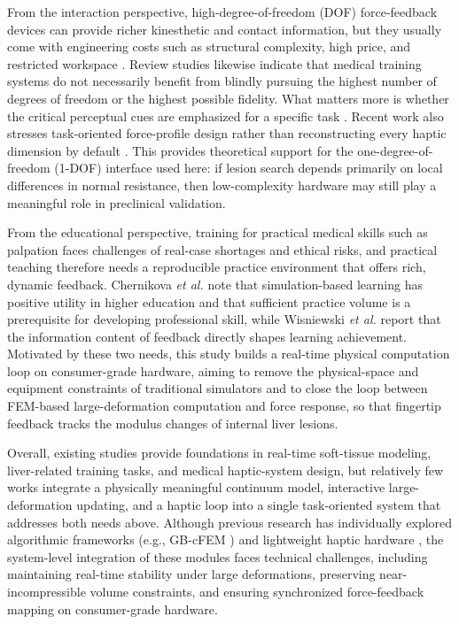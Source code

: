 \documentclass{ieeeaccess}
\begin{document}
From the interaction perspective, high-degree-of-freedom (DOF) force-feedback devices can provide richer kinesthetic and contact information, but they usually come with engineering costs such as structural complexity, high price, and restricted workspace \cite{agboh2016six}. Review studies likewise indicate that medical training systems do not necessarily benefit from blindly pursuing the highest number of degrees of freedom or the highest possible fidelity. What matters more is whether the critical perceptual cues are emphasized for a specific task \cite{overtoom2019haptic,rangarajan2020systematic}. Recent work also stresses task-oriented force-profile design rather than reconstructing every haptic dimension by default \cite{bjelland2025haptic}. This provides theoretical support for the one-degree-of-freedom (1-DOF) interface used here: if lesion search depends primarily on local differences in normal resistance, then low-complexity hardware may still play a meaningful role in preclinical validation.

From the educational perspective, training for practical medical skills such as palpation faces challenges of real-case shortages and ethical risks, and practical teaching therefore needs a reproducible practice environment that offers rich, dynamic feedback. Chernikova \emph{et al.} \cite{chernikova2020simulation} note that simulation-based learning has positive utility in higher education and that sufficient practice volume is a prerequisite for developing professional skill, while Wisniewski \emph{et al.} \cite{wisniewski2020power} report that the information content of feedback directly shapes learning achievement. Motivated by these two needs, this study builds a real-time physical computation loop on consumer-grade hardware, aiming to remove the physical-space and equipment constraints of traditional simulators and to close the loop between FEM-based large-deformation computation and force response, so that fingertip feedback tracks the modulus changes of internal liver lesions.

Overall, existing studies provide foundations in real-time soft-tissue modeling, liver-related training tasks, and medical haptic-system design, but relatively few works integrate a physically meaningful continuum model, interactive large-deformation updating, and a haptic loop into a single task-oriented system that addresses both needs above. Although previous research has individually explored algorithmic frameworks (e.g., GB-cFEM \cite{wang2025group}) and lightweight haptic hardware \cite{xu2025lightweight}, the system-level integration of these modules faces technical challenges, including maintaining real-time stability under large deformations, preserving near-incompressible volume constraints, and ensuring synchronized force-feedback mapping on consumer-grade hardware.
\end{document}
